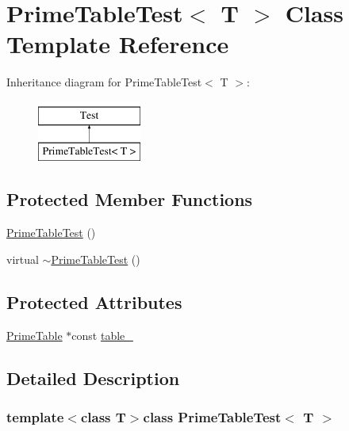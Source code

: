 \hypertarget{classPrimeTableTest}{\section{\-Prime\-Table\-Test$<$ \-T $>$ \-Class \-Template \-Reference}
\label{d3/d08/classPrimeTableTest}
}
\-Inheritance diagram for \-Prime\-Table\-Test$<$ \-T $>$\-:\begin{figure}[H]
\begin{center}
\leavevmode
\includegraphics[height=2.000000cm]{d3/d08/classPrimeTableTest}
\end{center}
\end{figure}
\subsection*{\-Protected \-Member \-Functions}
\begin{DoxyCompactItemize}
\item 
\hyperlink{classPrimeTableTest_ad1be5667c4dcc64c14635eeede52b5f2}{\-Prime\-Table\-Test} ()
\item 
virtual \hyperlink{classPrimeTableTest_a5ad347a64085bcdc8a7b457f44c4c2cd}{$\sim$\-Prime\-Table\-Test} ()
\end{DoxyCompactItemize}
\subsection*{\-Protected \-Attributes}
\begin{DoxyCompactItemize}
\item 
\hyperlink{classPrimeTable}{\-Prime\-Table} $\ast$const \hyperlink{classPrimeTableTest_a121125d1a512b0b272909d1a84c3819b}{table\-\_\-}
\end{DoxyCompactItemize}


\subsection{\-Detailed \-Description}
\subsubsection*{template$<$class T$>$class Prime\-Table\-Test$<$ T $>$}



